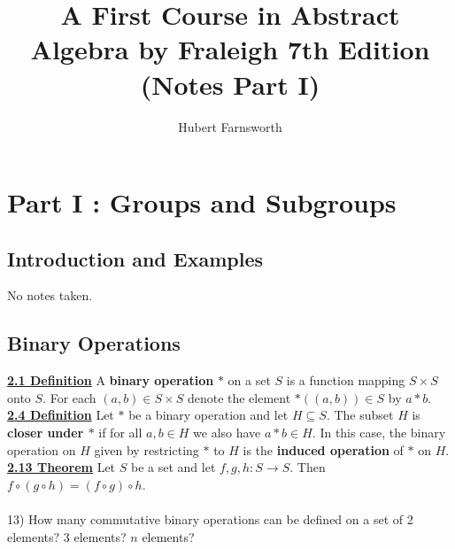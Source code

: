 \documentclass[12pt, letterpaper]{article}
\begin{document}
\title{A First Course in Abstract Algebra by Fraleigh 7th Edition (Notes Part I)}
\author{Hubert Farnsworth }  
\begin{titlepage}
\maketitle
\end{titlepage}
 
 
\section{Part I : Groups and Subgroups}

\subsection{Introduction and Examples}

No notes taken.
\subsection{Binary Operations}
 
\underline{{\bf 2.1 Definition}} A {\bf binary operation} $*$ on a set $S$ is a function mapping $S \times S$ onto $S$. For each $(a,b) \in S\times S$ denote the element $*((a,b)) \in S$ by $a*b$. \\

\noindent \underline{{\bf 2.4 Definition}} Let $*$ be a binary operation and let $H \subseteq S$. The subset $H$ is {\bf closer under $*$} if for all $a,b \in H$ we also have $a*b \in H$. In this case, the binary operation on $H$ given by restricting $*$ to $H$ is the {\bf induced operation} of $*$ on $H$. \\

\noindent \underline{{\bf 2.13 Theorem}} Let $S$ be a set and let $f,g,h : S \rightarrow S$. Then $f \circ (g \circ h) = (f\circ g) \circ h$.\\

 \\

13) How many commutative binary operations can be defined on a set of 2 elements? 3 elements? $n$ elements? \\
\end{document}
